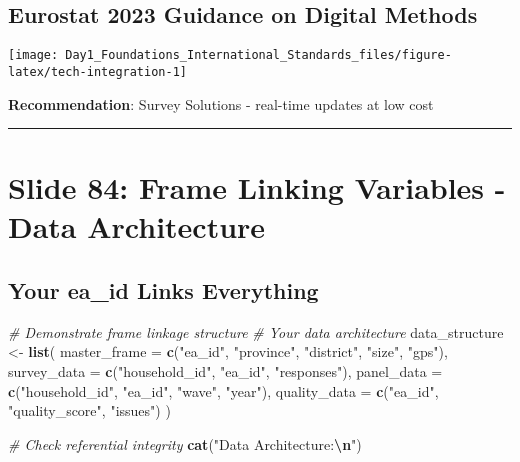 \documentclass[
]{article}
\newenvironment{Shaded}{\begin{snugshade}}{\end{snugshade}}
\newcommand{\AttributeTok}[1]{\textcolor[rgb]{0.13,0.29,0.53}{#1}}
\newcommand{\CommentTok}[1]{\textcolor[rgb]{0.56,0.35,0.01}{\textit{#1}}}
\newcommand{\FunctionTok}[1]{\textcolor[rgb]{0.13,0.29,0.53}{\textbf{#1}}}
\newcommand{\NormalTok}[1]{#1}
\newcommand{\OtherTok}[1]{\textcolor[rgb]{0.56,0.35,0.01}{#1}}
\newcommand{\SpecialCharTok}[1]{\textcolor[rgb]{0.81,0.36,0.00}{\textbf{#1}}}
\newcommand{\StringTok}[1]{\textcolor[rgb]{0.31,0.60,0.02}{#1}}
\begin{document}
\subsection{Eurostat 2023 Guidance on Digital
Methods}\label{eurostat-2023-guidance-on-digital-methods}

\texttt{[image: Day1\_Foundations\_International\_Standards\_files/figure-latex/tech-integration-1]}

\textbf{Recommendation}: Survey Solutions - real-time updates at low
cost

\begin{center}\rule{0.5\linewidth}{0.5pt}\end{center}

\section{Slide 84: Frame Linking Variables - Data
Architecture}\label{slide-84-frame-linking-variables---data-architecture}

\subsection{Your ea\_id Links
Everything}\label{your-ea_id-links-everything}

\begin{Shaded}
\begin{Highlighting}[]
\CommentTok{\# Demonstrate frame linkage structure}
\CommentTok{\# Your data architecture}
\NormalTok{data\_structure }\OtherTok{\textless{}{-}} \FunctionTok{list}\NormalTok{(}
  \AttributeTok{master\_frame =} \FunctionTok{c}\NormalTok{(}\StringTok{"ea\_id"}\NormalTok{, }\StringTok{"province"}\NormalTok{, }\StringTok{"district"}\NormalTok{, }\StringTok{"size"}\NormalTok{, }\StringTok{"gps"}\NormalTok{),}
  \AttributeTok{survey\_data =} \FunctionTok{c}\NormalTok{(}\StringTok{"household\_id"}\NormalTok{, }\StringTok{"ea\_id"}\NormalTok{, }\StringTok{"responses"}\NormalTok{),}
  \AttributeTok{panel\_data =} \FunctionTok{c}\NormalTok{(}\StringTok{"household\_id"}\NormalTok{, }\StringTok{"ea\_id"}\NormalTok{, }\StringTok{"wave"}\NormalTok{, }\StringTok{"year"}\NormalTok{),}
  \AttributeTok{quality\_data =} \FunctionTok{c}\NormalTok{(}\StringTok{"ea\_id"}\NormalTok{, }\StringTok{"quality\_score"}\NormalTok{, }\StringTok{"issues"}\NormalTok{)}
\NormalTok{)}

\CommentTok{\# Check referential integrity}
\FunctionTok{cat}\NormalTok{(}\StringTok{"Data Architecture:}\SpecialCharTok{\textbackslash{}n}\StringTok{"}\NormalTok{)}
\end{Highlighting}
\end{Shaded}
\end{document}
